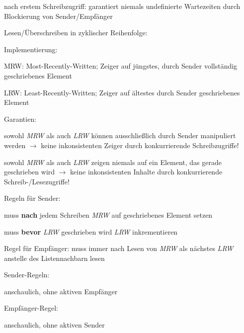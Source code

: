 \documentclass[a4paper]{article}
\begin{document}
\begin{multicols}{3}
    \begin{itemize*}
        \item
        nach erstem Schreibzugriff: garantiert niemals undefinierte
        Wartezeiten durch Blockierung von Sender/Empfänger
        \item
        Lesen/Überschreiben in zyklischer Reihenfolge:
        \item
        Implementierung:
        \begin{itemize*}
            \item MRW: Most-Recently-Written; Zeiger auf jüngstes, durch Sender vollständig geschriebenes Element
            \item LRW: Least-Recently-Written; Zeiger auf ältestes durch Sender geschriebenes Element
            \item Garantien: \begin{itemize*} \item sowohl \emph{MRW} als auch \emph{LRW} können ausschließlich durch Sender manipuliert werden $\rightarrow$ keine inkonsistenten Zeiger durch konkurrierende Schreibzugriffe! \item sowohl \emph{MRW} als auch \emph{LRW} zeigen niemals auf ein Element, das gerade geschrieben wird $\rightarrow$ keine inkonsistenten Inhalte durch konkurrierende Schreib-/Lesezugriffe! \end{itemize*}
            \item Regeln für Sender: \begin{itemize*} \item muss \textbf{nach} jedem Schreiben \emph{MRW} auf geschriebenes Element setzen \item muss \textbf{bevor} \emph{LRW} geschrieben wird \emph{LRW} inkrementieren \end{itemize*}
            \item Regel für Empfänger: muss immer nach Lesen von \emph{MRW} als nächstes \emph{LRW} anstelle des Listennachbarn lesen
        \end{itemize*}
        \item
        Sender-Regeln:
        \begin{itemize*}
            \item anschaulich, ohne aktiven Empfänger
        \end{itemize*}
        \item
        Empfänger-Regel:
        \begin{itemize*}
            \item anschaulich, ohne aktiven Sender
        \end{itemize*}
    \end{itemize*}


\end{multicols}
\end{document}
